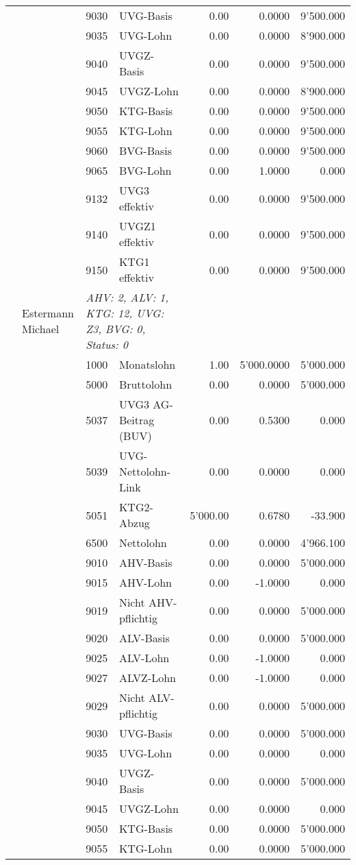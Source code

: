 \documentclass[15pt,a4paper]{article}
\begin{document}
\begin{longtable}{@{\extracolsep{\fill}}l l l l|r|r|r}
&&9030&UVG-Basis&0.00&0.0000&9'500.000\\
&&9035&UVG-Lohn&0.00&0.0000&8'900.000\\
&&9040&UVGZ-Basis&0.00&0.0000&9'500.000\\
&&9045&UVGZ-Lohn&0.00&0.0000&8'900.000\\
&&9050&KTG-Basis&0.00&0.0000&9'500.000\\
&&9055&KTG-Lohn&0.00&0.0000&9'500.000\\
&&9060&BVG-Basis&0.00&0.0000&9'500.000\\
&&9065&BVG-Lohn&0.00&1.0000&0.000\\
&&9132&UVG3 effektiv&0.00&0.0000&9'500.000\\
&&9140&UVGZ1 effektiv&0.00&0.0000&9'500.000\\
&&9150&KTG1 effektiv&0.00&0.0000&9'500.000\\
\pagebreak
8&Estermann Michael&\multicolumn{2}{l|}{\small\emph{AHV: 2, ALV: 1, KTG: 12, UVG: Z3, BVG: 0, Status: 0}}&& \\
&&1000&Monatslohn&1.00&5'000.0000&5'000.000\\
&&5000&Bruttolohn&0.00&0.0000&5'000.000\\
&&5037&UVG3 AG-Beitrag (BUV)&0.00&0.5300&0.000\\
&&5039&UVG-Nettolohn-Link&0.00&0.0000&0.000\\
&&5051&KTG2-Abzug&5'000.00&0.6780&-33.900\\
&&6500&Nettolohn&0.00&0.0000&4'966.100\\
&&9010&AHV-Basis&0.00&0.0000&5'000.000\\
&&9015&AHV-Lohn&0.00&-1.0000&0.000\\
&&9019&Nicht AHV-pflichtig&0.00&0.0000&5'000.000\\
&&9020&ALV-Basis&0.00&0.0000&5'000.000\\
&&9025&ALV-Lohn&0.00&-1.0000&0.000\\
&&9027&ALVZ-Lohn&0.00&-1.0000&0.000\\
&&9029&Nicht ALV-pflichtig&0.00&0.0000&5'000.000\\
&&9030&UVG-Basis&0.00&0.0000&5'000.000\\
&&9035&UVG-Lohn&0.00&0.0000&0.000\\
&&9040&UVGZ-Basis&0.00&0.0000&5'000.000\\
&&9045&UVGZ-Lohn&0.00&0.0000&0.000\\
&&9050&KTG-Basis&0.00&0.0000&5'000.000\\
&&9055&KTG-Lohn&0.00&0.0000&5'000.000\\

\end{longtable}
\end{document}
